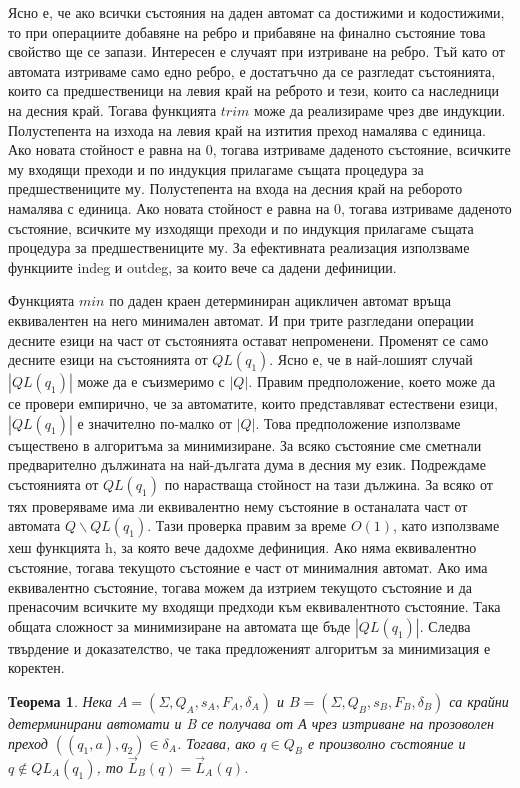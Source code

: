 \documentclass[a4paper,12pt]{article}
\newtheorem{thm}{Теорема}[section]
\begin{document}
Ясно е, че ако всички състояния на даден автомат са достижими и кодостижими, то при операциите добавяне на ребро и прибавяне на
финално състояние това свойство ще се запази. Интересен е случаят при изтриване на ребро. Тъй като от автомата изтриваме само едно ребро, е достатъчно да се
разгледат състоянията, които са предшественици на левия край на реброто и тези, които са наследници на десния край. Тогава
функцията $trim$ може да реализираме чрез две индукции. Полустепента на изхода на левия край на изтития преход намалява с единица.
Ако новата стойност е равна на 0, тогава изтриваме даденото състояние, всичките му входящи преходи и по индукция прилагаме същата
процедура за предшествениците му. Полустепента на входа на десния край на реборото намалява с единица. Ако новата стойност е равна на 0, тогава изтриваме
даденото състояние, всичките му изходящи преходи и по индукция прилагаме същата процедура за предшествениците му. За ефективната реализация използваме
функциите indeg и outdeg, за които вече са дадени дефиниции.

\bigskip

Функцията $min$ по даден краен детерминиран ацикличен автомат връща еквивалентен на него минимален автомат. И при трите разгледани операции
десните езици на част от състоянията остават непроменени. Променят се само десните езици на състоянията от $QL(q_1)$. Ясно е, че в най-лошият случай
$|QL(q_1)|$ може да е съизмеримо с $|Q|$. Правим предположение, което може да се провери емпирично, че за автоматите, които представляват естествени езици,
$|QL(q_1)|$ е значително по-малко от $|Q|$. Това предположение използваме съществено в алгоритъма за минимизиране. За всяко състояние сме сметнали предварително
дължината на най-дългата дума в десния му език. Подреждаме състоянията от $QL(q_1)$ по нарастваща стойност на тази дължина. За всяко от тях проверяваме има ли
еквивалентно нему състояние в останалата част от автомата $Q \backslash QL(q_1)$. Тази проверка правим за време $O(1)$, като използваме хеш функцията h,
за която вече дадохме дефиниция.
Ако няма еквивалентно състояние, тогава текущото състояние е част от минималния автомат. Ако има еквивалентно състояние, тогава можем да изтрием текущото
състояние и да пренасочим всичките му входящи предходи към еквивалентното състояние. Така общата сложност за минимизиране на автомата ще бъде $|QL(q_1)|$.
Следва твърдение и доказателство, че така предложеният алгоритъм за минимизация е коректен.

\begin{thm}
Нека $A = (\Sigma, Q_A, s_A, F_A, \delta_A)$ и $B = (\Sigma, Q_B, s_B, F_B, \delta_B)$ са крайни детерминирани автомати и B се получава от А чрез изтриване на
прозоволен преход $((q_1, a), q_2) \in \delta_A$. Тогава, ако $q \in Q_B$ е произволно състояние и $q \notin QL_A(q_1)$, то $\vec{L}_B(q) = \vec{L}_A(q)$.
\end{thm}
\end{document}

